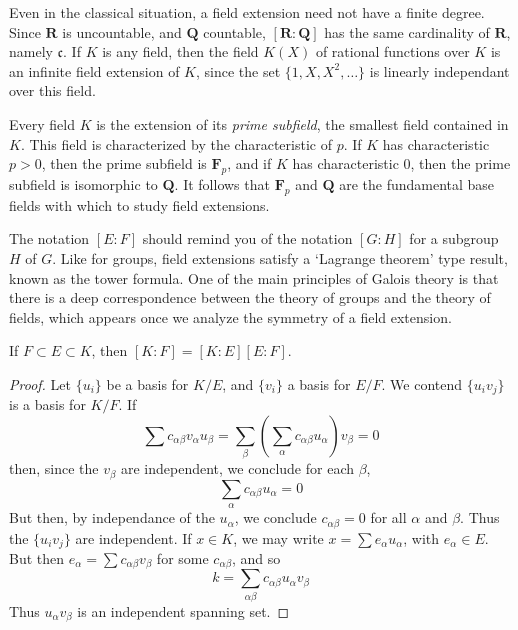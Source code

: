 \begin{example}
	Even in the classical situation, a field extension need not have a finite degree. Since $\mathbf{R}$ is uncountable, and $\mathbf{Q}$ countable, $[\mathbf{R}: \mathbf{Q}]$ has the same cardinality of $\mathbf{R}$, namely $\mathfrak{c}$. If $K$ is any field, then the field $K(X)$ of rational functions over $K$ is an infinite field extension of $K$, since the set $\{ 1, X, X^2, \dots \}$ is linearly independant over this field.
\end{example}

\begin{example}
    Every field $K$ is the extension of its {\it prime subfield}, the smallest field contained in $K$. This field is characterized by the characteristic of $p$. If $K$ has characteristic $p > 0$, then the prime subfield is $\mathbf{F}_p$, and if $K$ has characteristic 0, then the prime subfield is isomorphic to $\mathbf{Q}$. It follows that $\mathbf{F}_p$ and $\mathbf{Q}$ are the fundamental base fields with which to study field extensions.
\end{example}

The notation $[E:F]$ should remind you of the notation $[G:H]$ for a subgroup $H$ of $G$. Like for groups, field extensions satisfy a `Lagrange theorem' type result, known as the tower formula. One of the main principles of Galois theory is that there is a deep correspondence between the theory of groups and the theory of fields, which appears once we analyze the symmetry of a field extension.

\begin{theorem}
    If $F \subset E \subset K$, then $[K:F] = [K:E][E:F]$.
\end{theorem}
\begin{proof}
    Let $\{ u_i \}$ be a basis for $K/E$, and $\{ v_i \}$ a basis for $E/F$. We contend $\{ u_i v_j \}$ is a basis for $K/F$. If
    \[ \sum c_{\alpha \beta} v_\alpha u_\beta = \sum_\beta \left( \sum_\alpha c_{\alpha \beta} u_\alpha \right) v_\beta = 0 \]
    then, since the $v_\beta$ are independent, we conclude for each $\beta$,
    \[ \sum_\alpha c_{\alpha \beta} u_\alpha = 0 \]
    But then, by independance of the $u_\alpha$, we conclude $c_{\alpha \beta} = 0$ for all $\alpha$ and $\beta$. Thus the $\{ u_i v_j \}$ are independent. If $x \in K$, we may write $x = \sum e_\alpha u_\alpha$, with $e_\alpha \in E$. But then $e_\alpha = \sum c_{\alpha \beta} v_\beta$ for some $c_{\alpha \beta}$, and so
    \[ k = \sum_{\alpha \beta} c_{\alpha \beta} u_\alpha v_\beta \]
    Thus $u_\alpha v_\beta$ is an independent spanning set.
\end{proof}

